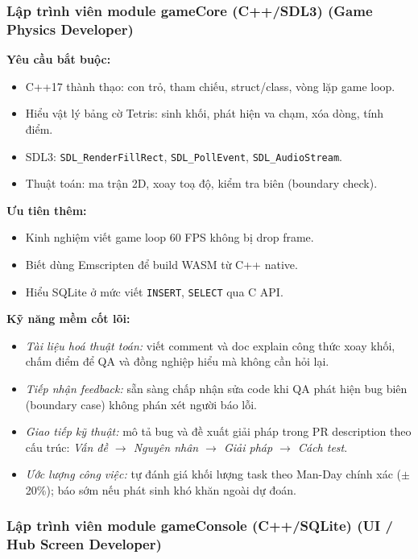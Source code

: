 \documentclass[12pt,a4paper]{article}
\begin{document}
\subsubsection{Lập trình viên module gameCore (C++/SDL3) (Game Physics Developer)}

\noindent\textbf{Yêu cầu bắt buộc:}
\begin{itemize}[nosep]
    \item C++17 thành thạo: con trỏ, tham chiếu, struct/class, vòng lặp game loop.
    \item Hiểu vật lý bảng cờ Tetris: sinh khối, phát hiện va chạm, xóa dòng, tính điểm.
    \item SDL3: \texttt{SDL\_RenderFillRect}, \texttt{SDL\_PollEvent}, \texttt{SDL\_AudioStream}.
    \item Thuật toán: ma trận 2D, xoay toạ độ, kiểm tra biên (boundary check).
\end{itemize}

\noindent\textbf{Ưu tiên thêm:}
\begin{itemize}[nosep]
    \item Kinh nghiệm viết game loop 60 FPS không bị drop frame.
    \item Biết dùng Emscripten để build WASM từ C++ native.
    \item Hiểu SQLite ở mức viết \texttt{INSERT}, \texttt{SELECT} qua C API.
\end{itemize}

\noindent\textbf{Kỹ năng mềm cốt lõi:}
\begin{itemize}[nosep]
    \item \textit{Tài liệu hoá thuật toán:} viết comment và doc explain công thức xoay khối,
          chấm điểm để QA và đồng nghiệp hiểu mà không cần hỏi lại.
    \item \textit{Tiếp nhận feedback:} sẵn sàng chấp nhận sửa code khi QA phát hiện bug
          biên (boundary case) không phán xét người báo lỗi.
    \item \textit{Giao tiếp kỹ thuật:} mô tả bug và đề xuất giải pháp trong PR description
          theo cấu trúc: \textit{Vấn đề $\to$ Nguyên nhân $\to$ Giải pháp $\to$ Cách test}.
    \item \textit{Ước lượng công việc:} tự đánh giá khối lượng task theo Man-Day chính xác
          ($\pm$20\%); báo sớm nếu phát sinh khó khăn ngoài dự đoán.
\end{itemize}

\subsubsection{Lập trình viên module gameConsole (C++/SQLite) (UI / Hub Screen Developer)}
\end{document}

